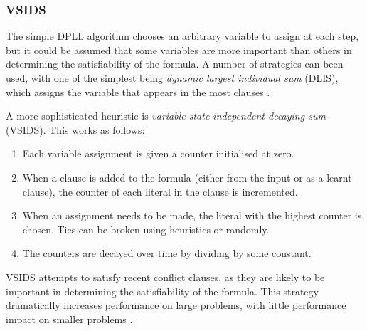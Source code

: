 \documentclass[conference]{IEEEtran}
\begin{document}
\subsubsection{VSIDS}
The simple DPLL algorithm chooses an arbitrary variable to assign at each step, but it could be assumed that some variables are more important than others in determining the satisfiability of the formula. A number of strategies can been used, with one of the simplest being \emph{dynamic largest individual sum} (DLIS), which assigns the variable that appears in the most clauses \cite{moskewicz2001chaff}.

A more sophisticated heuristic is \emph{variable state independent decaying sum} (VSIDS). This works as follows:
\begin{enumerate}
    \item Each variable assignment is given a counter initialised at zero.
    \item When a clause is added to the formula (either from the input or as a learnt clause), the counter of each literal in the clause is incremented.
    \item When an assignment needs to be made, the literal with the highest counter is chosen. Ties can be broken using heuristics or randomly.
    \item The counters are decayed over time by dividing by some constant.
\end{enumerate}
VSIDS attempts to satisfy recent conflict clauses, as they are likely to be important in determining the satisfiability of the formula. This strategy dramatically increases performance on large problems, with little performance impact on smaller problems \cite{moskewicz2001chaff}.
\end{document}
